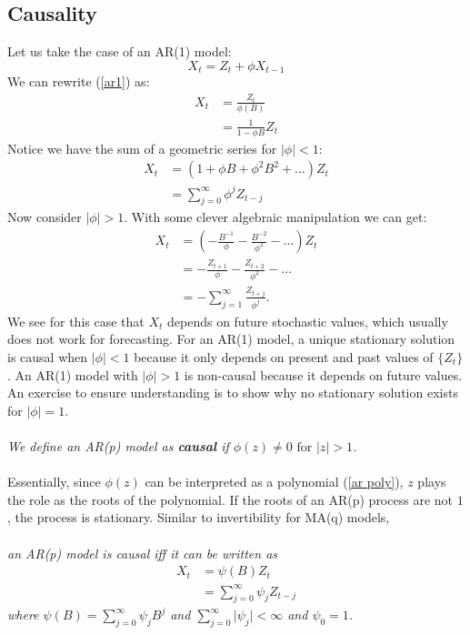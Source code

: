 \documentclass{article}
\begin{document}
\subsection{Causality}
Let us take the case of an AR(1) model:
\begin{equation}\label{ar1}
    X_t = Z_t + \phi X_{t-1}\nonumber
\end{equation}
We can rewrite (\ref{ar1}) as:
\begin{align}\label{ar1 soln}
    X_t &= \frac{Z_t}{\phi(B)}\nonumber\\
    &= \frac{1}{1-\phi B} Z_t
\end{align}
Notice we have the sum of a geometric series for $\lvert \phi \rvert < 1$:
\begin{align}\label{ar less 1}
    X_t &= (1 + \phi B + \phi^2 B^2 + \ldots)Z_t\nonumber\\
    &= \sum_{j=0}^{\infty} \phi^j Z_{t-j}
\end{align}
Now consider $\lvert \phi \rvert > 1$. With some clever algebraic manipulation we can get:
\begin{align}\label{ar greater 1}
    X_t &= (-\frac{B^{-1}}{\phi}-\frac{B^{-2}}{\phi^2}-\ldots)Z_t\nonumber\\
    &= -\frac{Z_{t+1}}{\phi} -\frac{Z_{t+2}}{\phi^2}-\ldots\nonumber\\
    &= - \sum_{j=1}^{\infty}\frac{Z_{t+j}}{\phi^j}.
\end{align}
We see for this case that $X_t$ depends on future stochastic values, which usually does not work for forecasting. For an AR(1) model, a unique stationary solution is causal when $\lvert \phi \rvert < 1$ because it only depends on present and past values of $\{Z_t\}$. An AR(1) model with $\lvert \phi \rvert > 1$ is non-causal because it depends on future values. An exercise to ensure understanding is to show why no stationary solution exists for $\lvert \phi \rvert=1$.\\\\
\textit{We define an AR(p) model as \textbf{causal} if $\phi(z)\neq 0 \text{ for } \lvert z \rvert > 1$.}\\\\
Essentially, since $\phi(z)$ can be interpreted as a polynomial (\ref{ar poly}), $z$ plays the role as the roots of the polynomial. If the roots of an AR(p) process are not $1$, the process is stationary. Similar to invertibility for MA(q) models,\\\\
\textit{an AR(p) model is causal iff it can be written as
\begin{align}\label{causal}
    X_t &=\psi(B)Z_t\nonumber\\
    &= \sum_{j=0}^{\infty}\psi_j Z_{t-j}
\end{align}
where $\psi(B)=\sum_{j=0}^{\infty}\psi_j B^j$ and $\sum_{j=0}^{\infty}\lvert \psi_j \rvert < \infty$ and $\psi_0=1$.}
\end{document}

